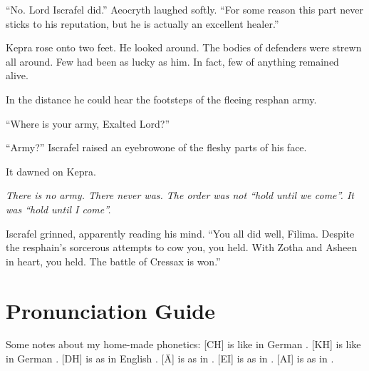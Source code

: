 \documentclass
  [a4paper,
   12pt,
   oneside
  ]%
  {article}
\begin{document}
``No. Lord Iscrafel did.'' Aeocryth laughed softly. 
``For some reason this part never sticks to his reputation, but he is actually an excellent healer.''

Kepra rose onto two feet. He looked around. 
The bodies of defenders were strewn all around. 
Few had been as lucky as him. 
In fact, few of anything remained alive. 

In the distance he could hear the footsteps of the fleeing resphan army. 

``Where is your army, Exalted Lord?''

``Army?'' Iscrafel raised an eyebrow\dash{}one of the fleshy parts of his face.

It dawned on Kepra. 

\emph{There is no army. There never was. The order was not ``hold until we come''. It was ``hold until I come''.}

Iscrafel grinned, apparently reading his mind. ``You all did well, Filima. Despite the resphain's sorcerous attempts to cow you, you held. With Zotha and Asheen in heart, you held. The battle of Cressax is won.''









\newpage
\appendix
\section{Pronunciation Guide}
Some notes about my home-made phonetics: 
[CH] is like in German . 
[KH] is like in German . 
[DH] is as in English . 
[Ä] is as in .
[EI] is as in .
[AI] is as in .    
\end{document}
